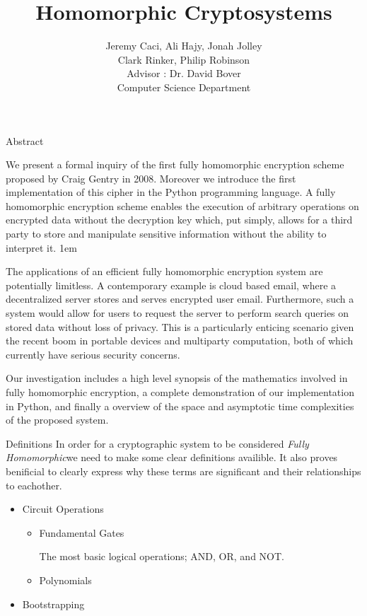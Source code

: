\documentclass[a0,portrait]{a0poster}
\title{Homomorphic Cryptosystems}
\author{
Jeremy Caci, Ali Hajy, Jonah Jolley\\
Clark Rinker, Philip Robinson\\
Advisor : Dr. David Bover\\
Computer Science Department
}
\begin{document}
\maketitle

\def\fh{{\em Fully Homomorphic\xspace}}

\begin{multicols}{2}
\begin{slide}{Abstract}

We present a formal inquiry of the first fully homomorphic encryption scheme proposed by Craig Gentry in 2008. Moreover we introduce the first implementation of this cipher in the Python programming language. A fully homomorphic encryption scheme enables the execution of arbitrary operations on encrypted data without the decryption key which, put simply, allows for a third party to  store and manipulate sensitive information without the ability to interpret it. 
\parskip 1em

The applications of an efficient fully homomorphic encryption system are potentially limitless. A contemporary example is cloud based email, where a decentralized server stores and serves encrypted user email. Furthermore, such a system would allow for users to request the server to perform search queries on stored data without loss of privacy. This is a particularly enticing scenario given the recent boom in portable devices and multiparty computation, both of which currently have serious security concerns. 

Our investigation includes a high level synopsis of the mathematics involved in fully homomorphic encryption, a complete demonstration of our implementation in Python, and finally a overview of the space and asymptotic time complexities of the proposed system. 

\end{slide}

\begin{slide}{Definitions}
In order for a cryptographic system to be considered \fh we need to make some clear definitions availible. It also proves benificial to clearly express why these terms are significant and their relationships to eachother. 

\begin{itemize}
\item Circuit Operations
\begin{itemize}
\item Fundamental Gates

  The most basic logical operations; AND, OR, and NOT. 
\item Polynomials
\end{itemize}
\item Bootstrapping


\end{itemize}
\end{slide}
\end{multicols}
\end{document}

